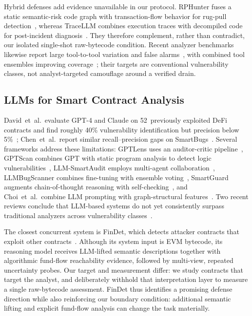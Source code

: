 \documentclass[sigconf]{acmart}
\begin{document}
Hybrid defenses add evidence unavailable in our protocol. RPHunter fuses a
static semantic-risk code graph with transaction-flow behavior for rug-pull
detection~\cite{wu2025rphunter}, whereas TraceLLM combines execution traces
with decompiled code for post-incident diagnosis~\cite{wang2025tracellm}.
They therefore complement, rather than contradict, our isolated
single-shot raw-bytecode condition. Recent analyzer benchmarks likewise
report large tool-to-tool variation and false
alarms~\cite{abdelaziz2026analyzers,salzano2026tools}, with combined tool
ensembles improving coverage~\cite{salzano2026tools}; their
targets are conventional vulnerability classes, not analyst-targeted
camouflage around a verified drain.

\subsection{LLMs for Smart Contract Analysis}\label{sec:related:llms}

David~et~al.\ evaluate GPT-4 and Claude on 52~previously exploited DeFi
contracts and find roughly 40\% vulnerability identification but precision
below 5\%~\cite{david2023manual}; Chen~et~al.\ report similar recall--precision
gaps on SmartBugs~\cite{chen2025chatgpt}. Several frameworks address these
limitations: GPTLens uses an auditor-critic pipeline~\cite{hu2023gptlens},
GPTScan combines GPT with static program analysis to detect logic
vulnerabilities~\cite{sun2024gptscan},
LLM-SmartAudit employs multi-agent collaboration~\cite{wei2024llmsmartaudit},
LLMBugScanner combines fine-tuning with ensemble
voting~\cite{yuan2025llmbugscanner}, SmartGuard augments chain-of-thought
reasoning with self-checking~\cite{ding2025smartguard}, and Choi~et~al.\
combine LLM prompting with graph-structural
features~\cite{choi2025graphllm}. Two recent reviews conclude that
LLM-based systems do not yet consistently surpass traditional analyzers
across vulnerability classes~\cite{ince2026gendetect,he2024llm4bs}.

The closest concurrent system is FinDet, which detects attacker contracts
that exploit other contracts~\cite{liu2025findet}. Although its system input
is EVM bytecode, its reasoning model receives LLM-lifted
semantic descriptions together with algorithmic fund-flow reachability
evidence, followed by multi-view, repeated uncertainty probes. Our target and measurement differ:
we study contracts that target the analyst, and deliberately withhold that
interpretation layer to measure a single raw-bytecode assessment. FinDet
thus identifies a promising defense direction while also reinforcing our
boundary condition: additional semantic lifting and explicit fund-flow
analysis can change the task materially.
\end{document}

